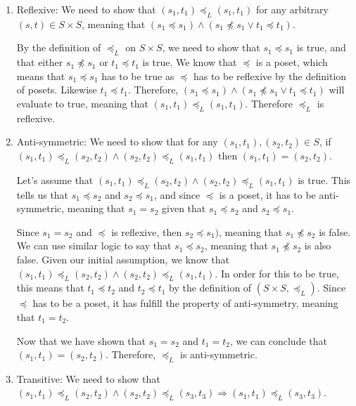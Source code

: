 \documentclass{article}
\begin{document}
\begin{enumerate}

\item Reflexive: We need to show that $(s_1, t_1) \preceq_{L} (s_1, t_1)$ for any arbitrary $(s, t) \in S \times S$, meaning that $(s_1\preceq s_1) \land (s_1 \npreceq s_1 \lor t_1 \preceq t_1)$.

By the definition of $\preceq_{L}$ on $S \times S$, we need to show that $s_1 \preceq s_1$ is true, and that either $s_1 \npreceq s_1$ or $t_1 \preceq t_1$ is true. We know that $\preceq$ is a poset, which means that $s_1 \preceq s_1$ has to be true as $\preceq$ has to be reflexive by the definition of posets. Likewise $t_1 \preceq t_1$. Therefore, $(s_1\preceq s_1) \land (s_1 \npreceq s_1 \lor t_1 \preceq t_1)$ will evaluate to true, meaning that $(s_1, t_1) \preceq_{L} (s_1, t_1)$. Therefore $\preceq_{L}$ is reflexive.

\item Anti-symmetric: We need to show that for any $(s_1, t_1), (s_2, t_2) \in S$, if $(s_1, t_1) \preceq_{L} (s_2, t_2) \land (s_2, t_2) \preceq_{L} (s_1, t_1)$ then $(s_1, t_1) = (s_2, t_2)$.

Let's assume that $(s_1, t_1) \preceq_{L} (s_2, t_2) \land (s_2, t_2) \preceq_{L} (s_1, t_1)$ is true. This tells us that $s_1 \preceq s_2$ and $s_2 \preceq s_1$, and since $\preceq$ is a poset, it has to be anti-symmetric, meaning that $s_1 = s_2$ given that $s_1 \preceq s_2$ and $s_2 \preceq s_1$. 

Since $s_1 = s_2$ and $\preceq$ is reflexive, then $s_2 \preceq s_1)$, meaning that $s_1 \npreceq s_2$ is false. We can use similar logic to say that $s_1 \preceq s_2$, meaning that $s_1 \npreceq s_2$ is also false. Given our initial assumption, we know that $(s_1, t_1) \preceq_{L} (s_2, t_2) \land (s_2, t_2) \preceq_{L} (s_1, t_1)$. In order for this to be true, this means that $t_1 \preceq t_2$ and $t_2 \preceq t_1$ by the definition of $(S \times S, \preceq_{L})$. Since $\preceq$ has to be a poset, it has fulfill the property of anti-symmetry, meaning that $t_1 = t_2$.

Now that we have shown that $s_1 = s_2$ and $t_1 = t_2$, we can conclude that $(s_1, t_1) = (s_2, t_2)$. Therefore, $\preceq_{L}$ is anti-symmetric.

\item Transitive: We need to show that $(s_1, t_1) \preceq_{L} (s_2, t_2) \land (s_2, t_2) \preceq_{L} (s_3, t_3) \Rightarrow (s_1, t_1) \preceq_{L} (s_3, t_3)$.


\end{enumerate}
\end{document}
